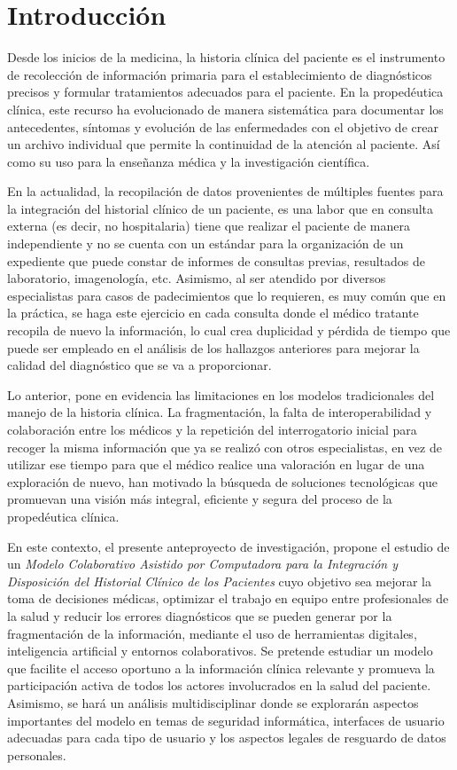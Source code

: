 \setlength{\parskip}{1em} %
\setlength{\parindent}{0pt} %
\section{Introducción}
Desde los inicios de la medicina, la historia clínica del paciente es el instrumento de recolección de información primaria para el establecimiento de diagnósticos precisos y formular tratamientos adecuados para el paciente. En la propedéutica clínica, este recurso ha evolucionado de manera sistemática para documentar los antecedentes, síntomas y evolución de las enfermedades con el objetivo de crear un archivo individual que permite la continuidad de la atención al paciente. Así como su uso para la enseñanza médica y la investigación científica. 

En la actualidad, la recopilación de datos provenientes de múltiples fuentes para la integración del historial clínico de un paciente, es una labor que en consulta externa (es decir, no hospitalaria) tiene que realizar el paciente de manera independiente y no se cuenta con un estándar para la organización de un expediente que puede constar de informes de consultas previas, resultados de laboratorio, imagenología, etc. Asimismo, al ser atendido por diversos especialistas para casos de padecimientos que lo requieren, es muy común que en la práctica, se haga este ejercicio en cada consulta donde el médico tratante recopila de nuevo la información, lo cual crea duplicidad y pérdida de tiempo que puede ser empleado en el análisis de los hallazgos anteriores para mejorar la calidad del diagnóstico que se va a proporcionar. 

Lo anterior, pone en evidencia las limitaciones en los modelos tradicionales del manejo de la historia clínica. La fragmentación, la falta de interoperabilidad y colaboración entre los médicos y la repetición del interrogatorio inicial para recoger la misma información que ya se realizó con otros especialistas, en vez de utilizar ese tiempo para que el médico realice una valoración en lugar de una exploración de nuevo, han motivado la búsqueda de soluciones tecnológicas que promuevan una visión más integral, eficiente y segura del proceso de la propedéutica clínica.

En este contexto, el presente anteproyecto de investigación, propone el estudio de un \textit{Modelo Colaborativo Asistido por Computadora para la Integración y Disposición del Historial Clínico de los Pacientes} cuyo objetivo sea mejorar la toma de decisiones médicas, optimizar el trabajo en equipo entre profesionales de la salud y reducir los errores diagnósticos que se pueden generar por la fragmentación de la información, mediante el uso de herramientas digitales, inteligencia artificial y entornos colaborativos. Se pretende estudiar un modelo que facilite el acceso oportuno a la información clínica relevante y promueva la participación activa de todos los actores involucrados en la salud del paciente. Asimismo, se hará un análisis multidisciplinar donde se explorarán aspectos importantes del modelo en temas de seguridad informática, interfaces de usuario adecuadas para cada tipo de usuario y los aspectos legales de resguardo de datos personales.
